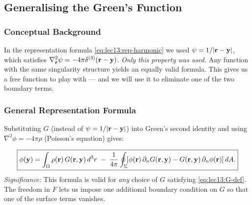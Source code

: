 \subsection{Generalising the Green's Function}\label{subsec:lec13-general-G}

\subsubsection*{Conceptual Background}
In the representation formula \eqref{eq:lec13:rep-harmonic} we used
$\psi = 1/|\mathbf{r}-\mathbf{y}|$, which satisfies
$\nabla^2_{\mathbf{r}}\psi = -4\pi\delta^{(3)}(\mathbf{r}-\mathbf{y})$.
\emph{Only this property was used.}  Any function with the same singularity structure
yields an equally valid formula.  This gives us a free function to play with — and we
will use it to eliminate one of the two boundary terms.


\subsubsection*{General Representation Formula}
Substituting $G$ (instead of $\psi = 1/|\mathbf{r}-\mathbf{y}|$) into Green's second identity and
using $\nabla^2\phi = -4\pi\rho$ (Poisson's equation) gives:

\begin{equation}\label{eq:lec13:rep-general}
  \boxed{
    \phi(\mathbf{y})
    = \int_\Omega \rho(\mathbf{r})\, G(\mathbf{r},\mathbf{y})\, d^3r
    \;-\; \frac{1}{4\pi}\oint_\Sigma
    \!\!\left[\phi(\mathbf{r})\,\partial_n G(\mathbf{r},\mathbf{y})
      - G(\mathbf{r},\mathbf{y})\,\partial_n\phi(\mathbf{r})\right]dA.
  }
\end{equation}
\textit{Significance:} This formula is valid for \emph{any} choice of $G$ satisfying
\eqref{eq:lec13:G-def}. The freedom in $F$ lets us impose one additional boundary
condition on $G$ so that one of the surface terms vanishes.

